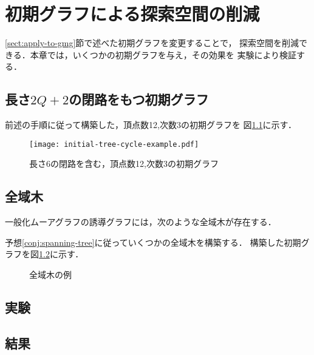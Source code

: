
\chapter{初期グラフによる探索空間の削減}
\label{chap:reduce-by-initial-graph}
\ref{sect:apply-to-gmg}節で述べた初期グラフを変更することで，
探索空間を削減できる．本章では，いくつかの初期グラフを与え，その効果を
実験により検証する．

\section{長さ$2Q+2$の閉路をもつ初期グラフ}
\label{sect:initial-graph-cycle}
\begin{example}
  前述の手順に従って構築した，頂点数12,次数3の初期グラフを
  図\ref{fig:initial-graph-cycle-example}に示す．
  \begin{figure}
    \centering
    \texttt{[image: initial-tree-cycle-example.pdf]}
    \caption{長さ6の閉路を含む，頂点数12,次数3の初期グラフ}
    \label{fig:initial-graph-cycle-example}
  \end{figure}
\end{example}

\section{全域木}
\label{sect:initial-spanning-tree}
\begin{conjecture}[全域木予想]
  \label{conj:spanning-tree}
  一般化ムーアグラフの誘導グラフには，次のような全域木が存在する．
\end{conjecture}
\begin{example}
  予想\ref{conj:spanning-tree}に従っていくつかの全域木を構築する．
  構築した初期グラフを図\ref{fig:initial-spanning-tree-example}に示す．
  \begin{figure}
    \centering
    \hfill
    \caption{全域木の例}
    \label{fig:initial-spanning-tree-example}
  \end{figure}
\end{example}

\section{実験}
\label{sect:exp-reduce-by-initial}

\section{結果}
\label{sect:result-reduce-by-initial}

